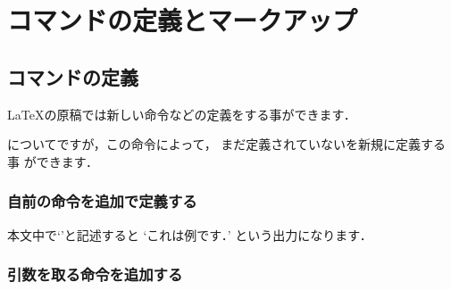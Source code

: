 \chapter{コマンドの定義とマークアップ}

\section{コマンドの定義}

%
%
{\LaTeX}の原稿では新しい命令などの定義をする事ができます．
\begin{usage}
\newcommand{$\<命令>$}[$\<引数の個数>$][$\<標準値>$]{$\<定義>$}
\renewcommand{$\<命令>$}[$\<引数の個数>$][$\<標準値>$]{$\<定義>$}
\end{usage}
についてですが，この命令によって，
まだ定義されていないを新規に定義する事
ができます．

\subsection{自前の命令を追加で定義する}
\begin{intext}
\newcommand{\example}{これは例です．}
\end{intext}

本文中で`'と記述すると
`これは例です．'
という出力になります．

\subsection{引数を取る命令を追加する}
\begin{intext}
\newcommand{\example}[2]{#1は#2です．}
\end{intext}

